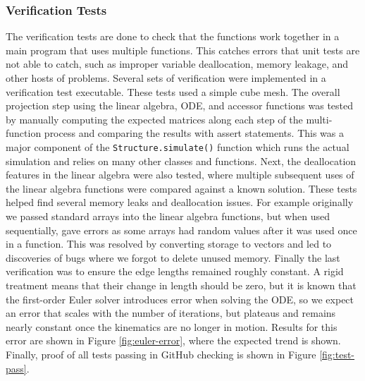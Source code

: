 \subsubsection{Verification Tests}
The verification tests are done to check that the functions work together in a main program that uses multiple functions. This catches errors that unit tests are not able to catch, such as improper variable deallocation, memory leakage, and other hosts of problems. Several sets of verification were implemented in a verification test executable. These tests used a simple cube mesh. The overall projection step using the linear algebra, ODE, and accessor functions was tested by manually computing the expected matrices along each step of the multi-function process and comparing the results with assert statements. This was a major component of the \texttt{Structure.simulate()} function which runs the actual simulation and relies on many other classes and functions. Next, the deallocation features in the linear algebra were also tested, where multiple subsequent uses of the linear algebra functions were compared against a known solution. These tests helped find several memory leaks and deallocation issues. For example originally we passed standard arrays into the linear algebra functions, but when used sequentially, gave errors as some arrays had random values after it was used once in a function. This was resolved by converting storage to vectors and led to discoveries of bugs where we forgot to delete unused memory. Finally the last verification was to ensure the edge lengths remained roughly constant. A rigid treatment means that their change in length should be zero, but it is known that the first-order Euler solver introduces error when solving the ODE, so we expect an error that scales with the number of iterations, but plateaus and remains nearly constant once the kinematics are no longer in motion. Results for this error are shown in Figure \ref{fig:euler-error}, where the expected trend is shown. Finally, proof of all tests passing in GitHub checking is shown in Figure \ref{fig:test-pass}.

